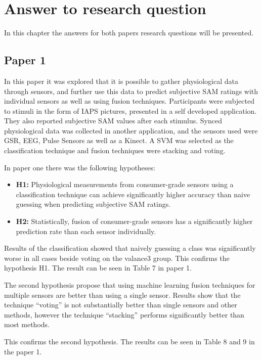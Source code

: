 \chapter{Answer to research question}
In this chapter the answers for both papers research questions will be presented.
\section{Paper 1}
In this paper it was explored that it is possible to gather physiological data through sensors, and further use this data to predict subjective SAM ratings with individual sensors as well as using fusion techniques. 
Participants were subjected to stimuli in the form of IAPS pictures, presented in a self developed application. 
They also reported subjective SAM values after each stimulus. 
Synced physiological data was collected in another application, and the sensors used were GSR, EEG, Pulse Sensors as well as a Kinect.
A SVM was selected as the classification technique and fusion techniques were stacking and voting.

In paper one there was the following hypotheses:
\begin{itemize}
    \item \textbf{H1:} Physiological measurements from consumer-grade sensors using a classification technique can achieve significantly higher accuracy than naive guessing when predicting subjective SAM ratings.
    \item \textbf{H2:} Statistically, fusion of consumer-grade sensors has a significantly
higher prediction rate than each sensor individually.
\end{itemize}

Results of the classification showed that naively guessing a class was significantly worse in all cases beside voting on the valance3 group. 
This confirms the hypothesis H1. The result can be seen in Table 7 in paper 1.

The second hypothesis propose that using machine learning fusion techniques for multiple sensors are better than using a single sensor. 
Results show that the technique ``voting'' is not substantially better than single sensors and other methods, however the technique ``stacking'' performs significantly better than most methods. 

This confirms the second hypothesis. The results can be seen in Table 8 and 9 in the paper 1.

